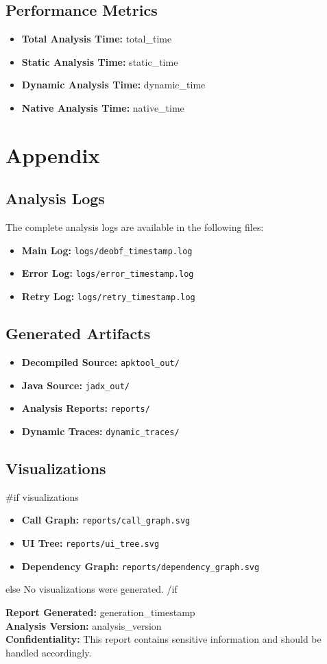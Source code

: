 \documentclass[11pt,a4paper]{article}
\begin{document}
\subsection{Performance Metrics}
\begin{itemize}
    \item \textbf{Total Analysis Time:} {{total_time}}
    \item \textbf{Static Analysis Time:} {{static_time}}
    \item \textbf{Dynamic Analysis Time:} {{dynamic_time}}
    \item \textbf{Native Analysis Time:} {{native_time}}
\end{itemize}

\section{Appendix}

\subsection{Analysis Logs}
The complete analysis logs are available in the following files:
\begin{itemize}
    \item \textbf{Main Log:} \texttt{logs/deobf\_{{timestamp}}.log}
    \item \textbf{Error Log:} \texttt{logs/error\_{{timestamp}}.log}
    \item \textbf{Retry Log:} \texttt{logs/retry\_{{timestamp}}.log}
\end{itemize}

\subsection{Generated Artifacts}
\begin{itemize}
    \item \textbf{Decompiled Source:} \texttt{apktool\_out/}
    \item \textbf{Java Source:} \texttt{jadx\_out/}
    \item \textbf{Analysis Reports:} \texttt{reports/}
    \item \textbf{Dynamic Traces:} \texttt{dynamic\_traces/}
\end{itemize}

\subsection{Visualizations}
{{#if visualizations}}
\begin{itemize}
    \item \textbf{Call Graph:} \texttt{reports/call\_graph.svg}
    \item \textbf{UI Tree:} \texttt{reports/ui\_tree.svg}
    \item \textbf{Dependency Graph:} \texttt{reports/dependency\_graph.svg}
\end{itemize}
{{else}}
No visualizations were generated.
{{/if}}

\vspace{2cm}

\begin{center}
\textbf{Report Generated:} {{generation_timestamp}} \\
\textbf{Analysis Version:} {{analysis_version}} \\
\textbf{Confidentiality:} This report contains sensitive information and should be handled accordingly.
\end{center}
\end{document}
